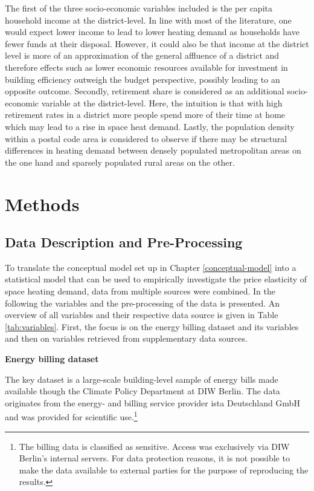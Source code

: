 \documentclass[12pt,twoside]{reedthesis}
\begin{document}
The first of the three socio-economic variables included is the per capita household income at the district-level. In line with most of the literature, one would expect lower income to lead to lower heating demand as households have fewer funds at their disposal. However, it could also be that income at the district level is more of an approximation of the general affluence of a district and therefore effects such as lower economic resources available for investment in building efficiency outweigh the budget perspective, possibly leading to an opposite outcome. Secondly, retirement share is considered as an additional socio-economic variable at the district-level. Here, the intuition is that with high retirement rates in a district more people spend more of their time at home which may lead to a rise in space heat demand. Lastly, the population density within a postal code area is considered to observe if there may be structural differences in heating demand between densely populated metropolitan areas on the one hand and sparsely populated rural areas on the other.

\hypertarget{methods}{%
\chapter{Methods}\label{methods}}

\hypertarget{data}{%
\section{Data Description and Pre-Processing}\label{data}}

To translate the conceptual model set up in Chapter \ref{conceptual-model} into a statistical model that can be used to empirically investigate the price elasticity of space heating demand, data from multiple sources were combined. In the following the variables and the pre-processing of the data is presented. An overview of all variables and their respective data source is given in Table \ref{tab:variables}. First, the focus is on the energy billing dataset and its variables and then on variables retrieved from supplementary data sources.

\textbf{Energy billing dataset}

The key dataset is a large-scale building-level sample of energy bills made available though the Climate Policy Department at DIW Berlin. The data originates from the energy- and billing service provider ista Deutschland GmbH and was provided for scientific use.\footnote{The billing data is classified as sensitive. Access was exclusively via DIW Berlin's internal servers. For data protection reasons, it is not possible to make the data available to external parties for the purpose of reproducing the results.}
\end{document}

